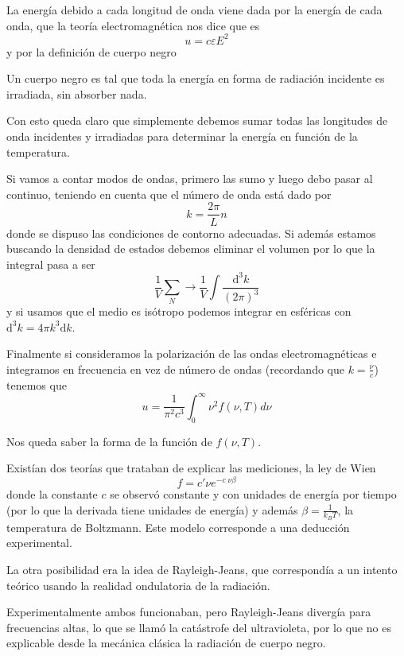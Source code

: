 La energía debido a cada longitud de onda viene dada por la energía de cada onda, que la teoría electromagnética nos dice que es
\begin{equation}
 u = c \varepsilon E^2
\end{equation}
y por la definición de cuerpo negro
\begin{definition}
    Un cuerpo negro es tal que toda la energía en forma de radiación incidente es irradiada, sin absorber nada.
\end{definition}
Con esto queda claro que simplemente debemos sumar todas las longitudes de onda incidentes y irradiadas para determinar la energía en función de la temperatura.

Si vamos a contar modos de ondas, primero las sumo y luego debo pasar al continuo, teniendo en cuenta que el número de onda está dado por 
\[ k = \frac{2 \pi}{L} n \]
donde se dispuso las condiciones de contorno adecuadas.
Si además estamos buscando la densidad de estados debemos eliminar el volumen por lo que la integral pasa a ser
\[ \frac{1}{V} \sum_N \to \frac{1}{V} \int \frac{\mathrm{d}^3k}{(2\pi)^3}\]
y si usamos que el medio es isótropo podemos integrar en esféricas con $\mathrm{d}^3k = 4\pi k^3 \mathrm{d}k$.

Finalmente si consideramos la polarización de las ondas electromagnéticas e integramos en frecuencia en vez de número de ondas (recordando que $k = \frac{\nu}{c}$) tenemos que
\begin{equation}
 u = \frac{1}{\pi^2 c^3} \int^\infty_0 \nu^2 f(\nu,T) d\nu
\end{equation}

Nos queda saber la forma de la función de $f(\nu,T)$.

Existían dos teorías que trataban de explicar las mediciones, la ley de Wien
\begin{equation}
    f = c' \nu e^{-c\;\nu \beta}
\end{equation}
donde la constante $c$ se observó constante y con unidades de energía por tiempo (por lo que la derivada tiene unidades de energía) y además $\beta = \frac{1}{k_B T}$, la temperatura de Boltzmann.
Este modelo corresponde a una deducción experimental.

La otra posibilidad era la idea de Rayleigh-Jeans, que correspondía a un intento teórico usando la realidad ondulatoria de la radiación.

Experimentalmente ambos funcionaban, pero Rayleigh-Jeans divergía para frecuencias altas, lo que se llamó la catástrofe del ultravioleta, por lo que no es explicable desde la mecánica clásica la radiación de cuerpo negro. 

